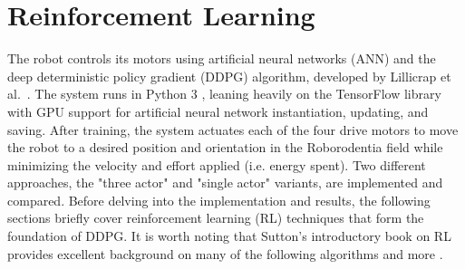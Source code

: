 \chapter{Reinforcement Learning}
The robot controls its motors using artificial neural networks (ANN) and the deep deterministic policy gradient (DDPG) algorithm, developed by Lillicrap et al.\ \cite{lillicrap_2016}. The system runs in Python 3 \cite{python3}, leaning heavily on the TensorFlow library with GPU support \cite{tensorflow} for artificial neural network instantiation, updating, and saving. After training, the system actuates each of the four drive motors to move the robot to a desired position and orientation in the Roborodentia field while minimizing the velocity and effort applied (i.e. energy spent). Two different approaches, the "three actor" and "single actor" variants, are implemented and compared. Before delving into the implementation and results, the following sections briefly cover reinforcement learning (RL) techniques that form the foundation of DDPG. It is worth noting that Sutton's introductory book on RL provides excellent background on many of the following algorithms and more \cite{sutton_2017}. 

